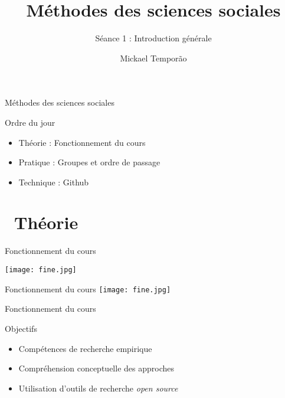 \documentclass[10pt]{beamer}
\title{Méthodes des sciences sociales}
\subtitle{Séance 1 : Introduction générale}
\author{Mickael Temporão}
\institute{\faEnvelope~$m.temporao@sciencespobordeaux.fr$\\\faTwitter~$@mickaeltemporao$}
\date{}
\begin{document}
\maketitle

\begin{frame}{Méthodes des sciences sociales}
    \begin{block}{Ordre du jour}
        \begin{itemize}
            \item[\faBook] Théorie : Fonctionnement du cours
            \item[\faFlask] Pratique : Groupes et ordre de passage
            \item[\faLaptopCode] Technique : Github \faGithubSquare
        \end{itemize}
    \end{block}
\end{frame}

\section{\faBook~Théorie }

\begin{frame}{Fonctionnement du cours}
    \begin{center}
    \texttt{[image: fine.jpg]}
    \end{center}
\end{frame}

\begin{frame}{Fonctionnement du cours}
    \texttt{[image: fine.jpg]}
\end{frame}

\begin{frame}{Fonctionnement du cours}

    \begin{block}{Objectifs}
        \begin{itemize}
            \item<2->[1.] Compétences de recherche empirique
            \item<3->[2.] Compréhension conceptuelle des approches
            \item<4->[3.] Utilisation d'outils de recherche \textit{open source}
        \end{itemize}
    \end{block}


\end{frame}
\end{document}
